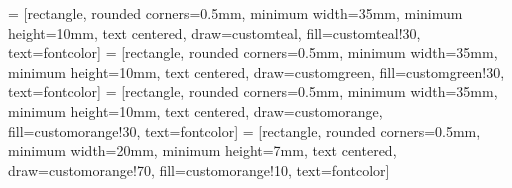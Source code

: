 \usepackage{xcolor}


 = [rectangle, rounded corners=0.5mm, minimum width=35mm, minimum height=10mm, text centered, draw=customteal, fill=customteal!30, text=fontcolor]
 = [rectangle, rounded corners=0.5mm, minimum width=35mm, minimum height=10mm, text centered, draw=customgreen, fill=customgreen!30, text=fontcolor]
 = [rectangle, rounded corners=0.5mm, minimum width=35mm, minimum height=10mm, text centered, draw=customorange, fill=customorange!30, text=fontcolor]
 = [rectangle, rounded corners=0.5mm, minimum width=20mm, minimum height=7mm, text centered, draw=customorange!70, fill=customorange!10, text=fontcolor]


